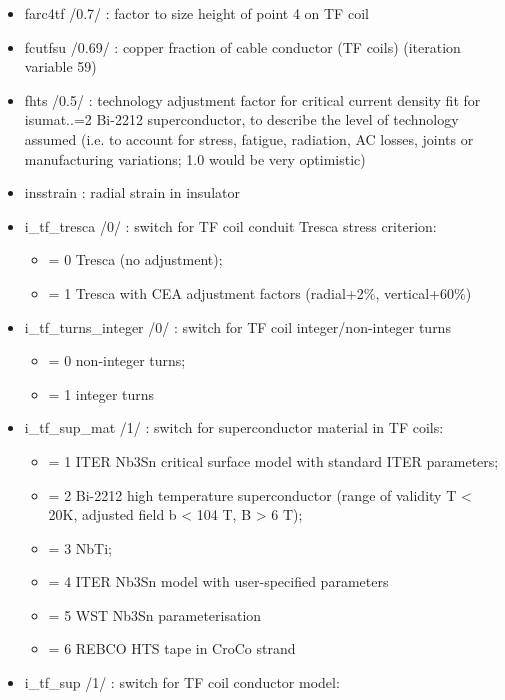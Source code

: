\documentclass[]{article}
\providecommand{\tightlist}{%
  \setlength{\itemsep}{0pt}\setlength{\parskip}{0pt}}
\begin{document}
\begin{itemize}
\item
  farc4tf /0.7/ : factor to size height of point 4 on TF coil
\item
  fcutfsu /0.69/ : copper fraction of cable conductor (TF coils)
  (iteration variable 59)
\item
  fhts /0.5/ : technology adjustment factor for critical current density
  fit for isumat..=2 Bi-2212 superconductor, to describe the level of
  technology assumed (i.e. to account for stress, fatigue, radiation, AC
  losses, joints or manufacturing variations; 1.0 would be very
  optimistic)
\item
  insstrain : radial strain in insulator
\item
  i\_tf\_tresca /0/ : switch for TF coil conduit Tresca stress
  criterion:

  \begin{itemize}
  \tightlist
  \item
    = 0 Tresca (no adjustment);
  \item
    = 1 Tresca with CEA adjustment factors (radial+2\%, vertical+60\%)
  \end{itemize}
\item
  i\_tf\_turns\_integer /0/ : switch for TF coil integer/non-integer
  turns

  \begin{itemize}
  \tightlist
  \item
    = 0 non-integer turns;
  \item
    = 1 integer turns
  \end{itemize}
\item
  i\_tf\_sup\_mat /1/ : switch for superconductor material in TF coils:

  \begin{itemize}
  \tightlist
  \item
    = 1 ITER Nb3Sn critical surface model with standard ITER parameters;
  \item
    = 2 Bi-2212 high temperature superconductor (range of validity T
    \textless{} 20K, adjusted field b \textless{} 104 T, B
    \textgreater{} 6 T);
  \item
    = 3 NbTi;
  \item
    = 4 ITER Nb3Sn model with user-specified parameters
  \item
    = 5 WST Nb3Sn parameterisation
  \item
    = 6 REBCO HTS tape in CroCo strand
  \end{itemize}
\item
  i_tf_sup /1/ : switch for TF coil conductor model:


\end{itemize}
\end{document}
